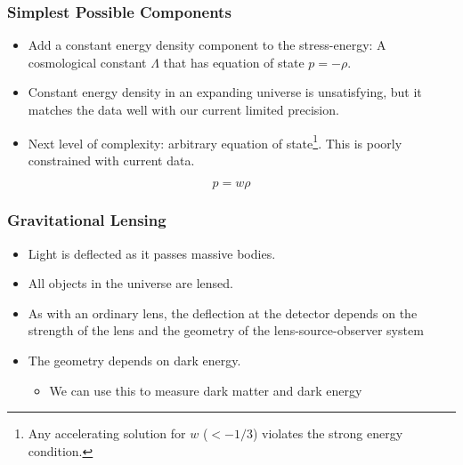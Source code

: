\documentclass{beamer}
\begin{document}
\frame
{
    \frametitle{Simplest Possible Components}

    \begin{itemize}

        \item Add a constant energy density component to the stress-energy:   A
            cosmological constant $\Lambda$ that has equation of
            state  $p=-\rho$.
            
        \item Constant energy density in an expanding universe is unsatisfying,
            but it matches the data well with our current limited precision.

        \item Next level of complexity: arbitrary equation of
            state\footnote{Any accelerating solution for $w$ ($< - 1/3$)
            violates the strong energy condition.}.  This is poorly constrained
            with current data.

    \end{itemize}

    \begin{equation}
        p = w \rho
    \end{equation}


}



\frame
{
    \frametitle{Gravitational Lensing}

    \begin{itemize}

        \item Light is deflected as it passes massive bodies.

        \item All objects in the universe are lensed.

        \item As with an ordinary lens, the deflection at the detector depends
            on the strength of the lens and the geometry of the
            lens-source-observer system

        \item The geometry depends on dark energy.
            
        \begin{itemize}
            \item We can use this to measure dark matter and dark energy
        \end{itemize}

    \end{itemize}

}
\end{document}
